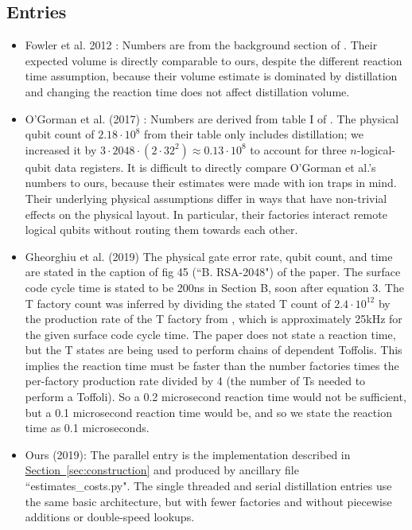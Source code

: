 \documentclass[superscriptaddress,notitlepage,longbibliography]{revtex4-1}
\theoremstyle{definition}
\theoremstyle{definition}
\renewcommand{\sec}[1]{\hyperref[sec:#1]{Section~\ref*{sec:#1}}}
\begin{document}
\subsection{Entries}

\begin{itemize}
    \item Fowler et al. 2012 \cite{fowler2012surfacecodereview}:
        Numbers are from the background section of \cite{fowler2012surfacecodereview}.
        Their expected volume is directly comparable to ours, despite the different reaction time assumption, because their volume estimate is dominated by distillation and changing the reaction time does not affect distillation volume.
    \item O'Gorman et al. (2017) \cite{ogorman2017factories}:
        Numbers are derived from table I of \cite{ogorman2017factories}.
        The physical qubit count of $2.18 \cdot 10^8$ from their table only includes distillation; we increased it by $3 \cdot 2048 \cdot (2 \cdot 32^2) \approx 0.13 \cdot 10^8$ to account for three $n$-logical-qubit data registers.
        It is difficult to directly compare O'Gorman et al.'s numbers to ours, because their estimates were made with ion traps in mind.
        Their underlying physical assumptions differ in ways that have non-trivial effects on the physical layout.
        In particular, their factories interact remote logical qubits without routing them towards each other.
    \item Gheorghiu et al. (2019) \cite{gheorghiu2019cryptanalysis}
        The physical gate error rate, qubit count, and time are stated in the caption of fig 45 (``B. RSA-2048") of the paper.
        The surface code cycle time is stated to be 200ns in Section B, soon after equation 3.
        The T factory count was inferred by dividing the stated T count of $2.4 \cdot 10^{12}$ by the production rate of the T factory from \cite{fowler2018}, which is approximately 25kHz for the given surface code cycle time.
        The paper does not state a reaction time, but the T states are being used to perform chains of dependent Toffolis.
        This implies the reaction time must be faster than the number factories times the per-factory production rate divided by 4 (the number of Ts needed to perform a Toffoli).
        So a 0.2 microsecond reaction time would not be sufficient, but a 0.1 microsecond reaction time would be, and so we state the reaction time as 0.1 microseconds.
        \\
    \item Ours (2019):
        The parallel entry is the implementation described in \sec{construction} and produced by ancillary file ``estimates\_costs.py".
        The single threaded and serial distillation entries use the same basic architecture, but with fewer factories and without piecewise additions or double-speed lookups.
\end{itemize}
\end{document}
